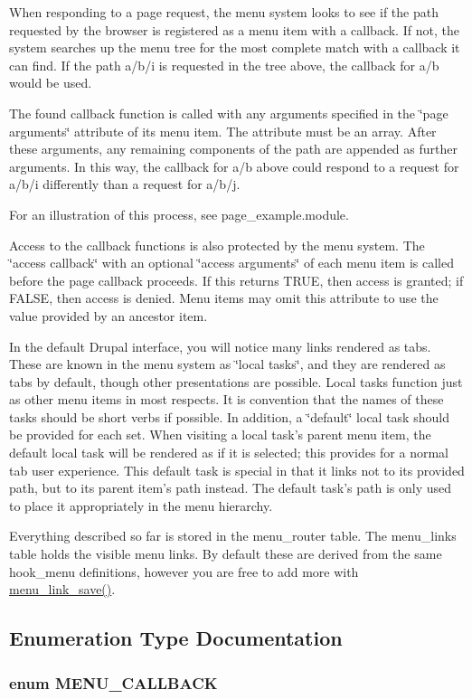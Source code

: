 When responding to a page request, the menu system looks to see if the path requested by the browser is registered as a menu item with a callback. If not, the system searches up the menu tree for the most complete match with a callback it can find. If the path a/b/i is requested in the tree above, the callback for a/b would be used.

The found callback function is called with any arguments specified in the \char`\"{}page arguments\char`\"{} attribute of its menu item. The attribute must be an array. After these arguments, any remaining components of the path are appended as further arguments. In this way, the callback for a/b above could respond to a request for a/b/i differently than a request for a/b/j.

For an illustration of this process, see page\_\-example.module.

Access to the callback functions is also protected by the menu system. The \char`\"{}access callback\char`\"{} with an optional \char`\"{}access arguments\char`\"{} of each menu item is called before the page callback proceeds. If this returns TRUE, then access is granted; if FALSE, then access is denied. Menu items may omit this attribute to use the value provided by an ancestor item.

In the default Drupal interface, you will notice many links rendered as tabs. These are known in the menu system as \char`\"{}local tasks\char`\"{}, and they are rendered as tabs by default, though other presentations are possible. Local tasks function just as other menu items in most respects. It is convention that the names of these tasks should be short verbs if possible. In addition, a \char`\"{}default\char`\"{} local task should be provided for each set. When visiting a local task's parent menu item, the default local task will be rendered as if it is selected; this provides for a normal tab user experience. This default task is special in that it links not to its provided path, but to its parent item's path instead. The default task's path is only used to place it appropriately in the menu hierarchy.

Everything described so far is stored in the menu\_\-router table. The menu\_\-links table holds the visible menu links. By default these are derived from the same hook\_\-menu definitions, however you are free to add more with \hyperlink{group__menu_g4fe84fbe31b5a3b6c7fa43e8fe912fb0}{menu\_\-link\_\-save()}. 

\subsection{Enumeration Type Documentation}
\hypertarget{group__menu_g92850b428279a637ce9bac5c1757700f}{
\subsubsection[{MENU\_\-CALLBACK}]{\setlength{\rightskip}{0pt plus 5cm}enum {\bf MENU\_\-CALLBACK}}}
\label{group__menu_g92850b428279a637ce9bac5c1757700f}


